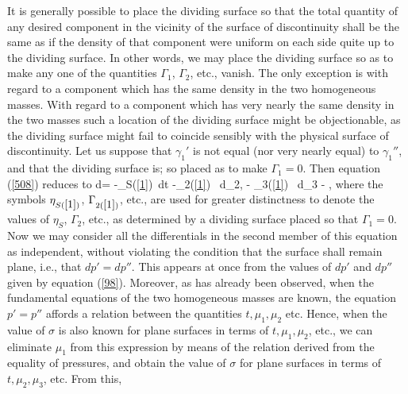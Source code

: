 \documentclass[12pt]{article}
\begin{document}
{It is generally possible to place the dividing surface so that the total quantity of any desired component in the vicinity of the surface of discontinuity shall be the same as if the density of that component were uniform on each side quite up to the dividing surface. In other words, we may place the dividing surface so as to make any one of the quantities $\Gamma_1$, $\Gamma_2$, etc., vanish. The only exception is with regard to a component which has the same density in the two homogeneous masses. With regard to a component which has very nearly the same density in the two masses such a location of the dividing surface might be objectionable, as the dividing surface might fail to coincide sensibly with the physical surface of discontinuity. Let us suppose that $\gamma_1'$ is not equal (nor very nearly equal) to $\gamma_1''$, and that the dividing surface is; so placed as to make $\Gamma_1=0$. Then equation (\ref{508}) reduces to
\eqs d\sigma = -\eta_{S(\ref{1})}\, dt -\Gamma_{2(\ref{1})} \, d\mu_2, - \Gamma_{3(\ref{1})} \, d\mu_3 - , \label{514}\eqe 
where the symbols $\eta_{S(\ref{1})}$, $\Gamma_{2(\ref{1})}$, etc., are used for greater distinctness to denote the values of $\eta_S$, $\Gamma_2$, etc., as determined by a dividing surface placed so that $\Gamma_1=0$. Now we may consider all the differentials in the second member of this equation as independent, without violating the condition that the surface shall remain plane, i.e., that $dp'=dp''$. This appears at once from the values of $dp'$ and $dp''$ given by equation (\ref{98}).  Moreover, as has already been observed, when the fundamental equations of the two homogeneous masses are known, the equation $p'=p''$ affords a relation between the quantities $t, \mu_1, \mu_2$ etc. Hence, when the value of $\sigma$ is also known for plane surfaces in terms of  $t, \mu_1, \mu_2$, etc., we can eliminate $\mu_1$ from  this expression by means of the relation derived from the equality of pressures, and obtain the value of $\sigma$ for plane surfaces in terms of $t, \mu_2,\mu_3$, etc. From  this,
}
\end{document}
